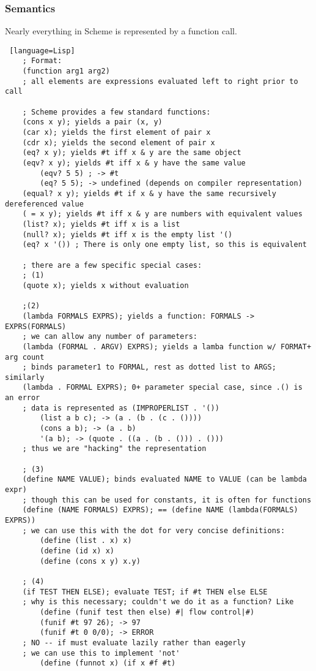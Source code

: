 \documentclass[../../lecture_notes.tex]{subfiles}
\begin{document}
\subsubsection*{Semantics}
\noindent Nearly everything in Scheme is represented by a function call.
\begin{lstlisting} [language=Lisp]
	; Format:
	(function arg1 arg2)
	; all elements are expressions evaluated left to right prior to call
 
	; Scheme provides a few standard functions:
	(cons x y); yields a pair (x, y)
	(car x); yields the first element of pair x
	(cdr x); yields the second element of pair x
	(eq? x y); yields #t iff x & y are the same object
	(eqv? x y); yields #t iff x & y have the same value
		(eqv? 5 5) ; -> #t
		(eq? 5 5); -> undefined (depends on compiler representation)
	(equal? x y); yields #t if x & y have the same recursively dereferenced value
	( = x y); yields #t iff x & y are numbers with equivalent values
	(list? x); yields #t iff x is a list
	(null? x); yields #t iff x is the empty list '()
	(eq? x '()) ; There is only one empty list, so this is equivalent
 
	; there are a few specific special cases:
	; (1)
	(quote x); yields x without evaluation
 
	;(2)
	(lambda FORMALS EXPRS); yields a function: FORMALS -> EXPRS(FORMALS)
	; we can allow any number of parameters:
	(lambda (FORMAL . ARGV) EXPRS); yields a lamba function w/ FORMAT+ arg count
	; binds parameter1 to FORMAL, rest as dotted list to ARGS; similarly
	(lambda . FORMAL EXPRS); 0+ parameter special case, since .() is an error
	; data is represented as (IMPROPERLIST . '())
		(list a b c); -> (a . (b . (c . ())))
		(cons a b); -> (a . b)
		'(a b); -> (quote . ((a . (b . ())) . ()))
	; thus we are "hacking" the representation
 
	; (3)
	(define NAME VALUE); binds evaluated NAME to VALUE (can be lambda expr)
	; though this can be used for constants, it is often for functions
	(define (NAME FORMALS) EXPRS); == (define NAME (lambda(FORMALS) EXPRS))
	; we can use this with the dot for very concise definitions:
		(define (list . x) x)
		(define (id x) x)
		(define (cons x y) x.y)
 
	; (4)
	(if TEST THEN ELSE); evaluate TEST; if #t THEN else ELSE
	; why is this necessary; couldn't we do it as a function? Like
		(define (funif test then else) #| flow control|#)
		(funif #t 97 26); -> 97
		(funif #t 0 0/0); -> ERROR
	; NO -- if must evaluate lazily rather than eagerly
	; we can use this to implement 'not'
		(define (funnot x) (if x #f #t)
 

\end{lstlisting}
\end{document}
